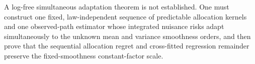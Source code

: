 A log-free simultaneous adaptation theorem is not established.  One must construct one fixed, law-independent sequence of predictable allocation kernels and one observed-path estimator whose integrated nuisance risks adapt simultaneously to the unknown mean and variance smoothness orders, and then prove that the sequential allocation regret and cross-fitted regression remainder preserve the fixed-smoothness constant-factor scale.